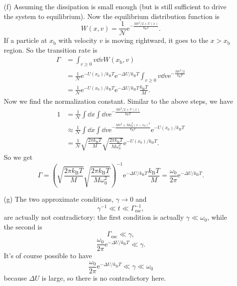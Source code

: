 \documentclass[hyperref, a4paper]{article}
\newcommand*{\ee}{\mathrm{e}}
\begin{document}
\begin{itemize}
\item[(f)] Assuming the dissipation is small enough (but is still sufficient to drive the system to equilibrium).
Now the equilibrium distribution function is 
\begin{equation}
    W(x, v) = \frac{1}{\mathcal{N}} \ee^{- \frac{M v^2 / 2 + U(x)}{k_{\text{B}} T}}.
\end{equation}
If a particle at $x_{\text{b}}$ with velocity $v$ is moving rightward,
it goes to the $x > x_{\text{b}}$ region.
So the transition rate is 
\[
    \begin{aligned}
        \Gamma &= \int_{v \geq 0} v \dd{v} W(x_{\text{b}}, v) \\
        &= \frac{1}{\mathcal{N}} \ee^{- U(x_0) / k_{\text{B}} T}
        \ee^{- \Delta U / k_{\text{B}} T} 
        \int_{v \geq 0} v \dd{v} \ee^{- \frac{M v^2 / 2}{k_{\text{B}} T}} \\
        &= \frac{1}{\mathcal{N}} \ee^{- U(x_0) / k_{\text{B}} T}
        \ee^{- \Delta U / k_{\text{B}} T}
        \frac{k_{\text{B}} T}{M}.
    \end{aligned}
\]
Now we find the normalization constant.
Similar to the above steps, we have 
\[
    \begin{aligned}
        1 &= \frac{1}{\mathcal{N}} \int \dd{x} \int \dd{v} \ee^{- \frac{M v^2 / 2 + U(x)}{k_{\text{B}} T}} \\
        &\approx  \frac{1}{\mathcal{N}}  \int \dd{x} \int \dd{v}
        \ee^{- \frac{M v^2 + M \omega_0^2 (x - x_0)^2}{k_{\text{B}} T}} 
        \ee^{- U(x_0) / k_{\text{B}} T }\\
        &= \frac{1}{\mathcal{N}} \sqrt{\frac{2\pi k_{\text{B}} T}{M}} 
        \sqrt{\frac{2\pi k_{\text{B}} T}{M \omega_0^2}} \ee^{- U(x_0) / k_{\text{B}} T }.
    \end{aligned}
\]
So we get 
\begin{equation}
    \Gamma = \left(\sqrt{\frac{2\pi k_{\text{B}} T}{M}} 
    \sqrt{\frac{2\pi k_{\text{B}} T}{M \omega_0^2}} \right)^{-1}
    \ee^{- \Delta U / k_{\text{B}} T}
    \frac{k_{\text{B}} T}{M}
    = \frac{\omega_0}{2\pi} \ee^{- \Delta U / k_{\text{B}} T}.
\end{equation}

\item[(g)] The two approximate conditions, $\gamma \to 0$ and 
\begin{equation}
    \gamma^{-1} \ll t \ll \Gamma_{\text{esc}}^{-1},
\end{equation}
are actually not contradictory:
the first condition is actually $\gamma \ll \omega_0$,
while the second is 
\[
    \Gamma_{\text{esc}} \ll \gamma,
\]
\[
    \frac{\omega_0}{2\pi} \ee^{- \Delta U / k_{\text{B}} T} \ll \gamma.
\]
It's of course possible to have 
\begin{equation}
    \frac{\omega_0}{2\pi} \ee^{- \Delta U / k_{\text{B}} T} \ll \gamma \ll \omega_0
\end{equation}
because $\Delta U$ is large, so there is no contradictory here.


\end{itemize}
\end{document}
